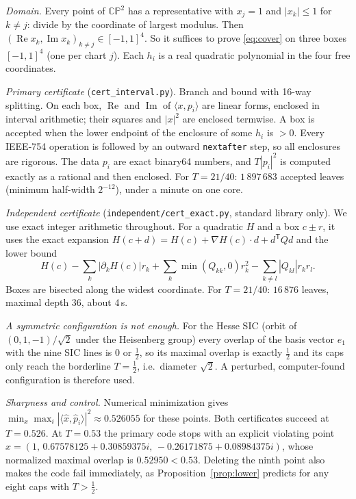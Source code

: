 \documentclass[11pt]{amsart}
\theoremstyle{remark}
\newcommand{\CP}{\mathbb{CP}}
\begin{document}
\emph{Domain.} Every point of $\CP^2$ has a representative with $x_j=1$ and
$|x_k|\le1$ for $k\ne j$: divide by the coordinate of largest modulus. Then
$(\operatorname{Re}x_k,\operatorname{Im}x_k)_{k\ne j}\in[-1,1]^4$. So it suffices to prove
\eqref{eq:cover} on three boxes $[-1,1]^4$ (one per chart $j$). Each
$h_i$ is a real quadratic polynomial in the four free coordinates.

\emph{Primary certificate} (\texttt{cert\_interval.py}). Branch and bound with
16-way splitting. On each box, $\operatorname{Re}$ and $\operatorname{Im}$ of
$\langle x,p_i\rangle$ are linear forms, enclosed in interval arithmetic; their
squares and $|x|^2$ are enclosed termwise. A box is accepted when the lower
endpoint of the enclosure of some $h_i$ is $>0$. Every IEEE-754 operation is
followed by an outward \texttt{nextafter} step, so all enclosures are rigorous.
The data $p_i$ are exact binary64 numbers, and $T|p_i|^2$ is computed exactly as a
rational and then enclosed. For $T=21/40$: $1\,897\,683$ accepted leaves
(minimum half-width $2^{-12}$), under a minute on one core.

\emph{Independent certificate} (\texttt{independent/cert\_exact.py},
standard library only). We use exact integer arithmetic throughout. For a quadratic $H$ and a
box $c\pm r$, it uses the exact expansion $H(c+d)=H(c)+\nabla H(c)\cdot d+d^{\mathsf T}Qd$
and the lower bound
\[
 H(c)-\sum_k|\partial_kH(c)|r_k+\sum_k\min(Q_{kk},0)r_k^2-\sum_{k\ne l}|Q_{kl}|r_kr_l .
\]
Boxes are bisected along the widest coordinate. For $T=21/40$: $16\,876$ leaves,
maximal depth $36$, about 4\,s.

\emph{A symmetric configuration is not enough.} For the Hesse SIC (orbit of
$(0,1,-1)/\sqrt2$ under the Heisenberg group) every overlap of the basis vector $e_1$ with the nine SIC lines is $0$ or $\tfrac12$,
so its maximal overlap is exactly $\tfrac12$ and its caps only reach the borderline $T=\tfrac12$, i.e.\ diameter $\sqrt2$.
A perturbed, computer-found configuration is therefore used.

\emph{Sharpness and control.} Numerical minimization gives
$\min_x\max_i |\langle \hat x,\hat p_i\rangle|^2\approx0.526055$ for these points.
Both certificates succeed at $T=0.526$. At $T=0.53$ the primary code stops with an
explicit violating point
$x=(1,\,0.67578125+0.30859375i,\,-0.26171875+0.08984375i)$, whose normalized
maximal overlap is $0.52950<0.53$. Deleting the ninth point also makes the code
fail immediately, as Proposition~\ref{prop:lower} predicts for any eight caps with $T>\tfrac12$.
\end{document}
